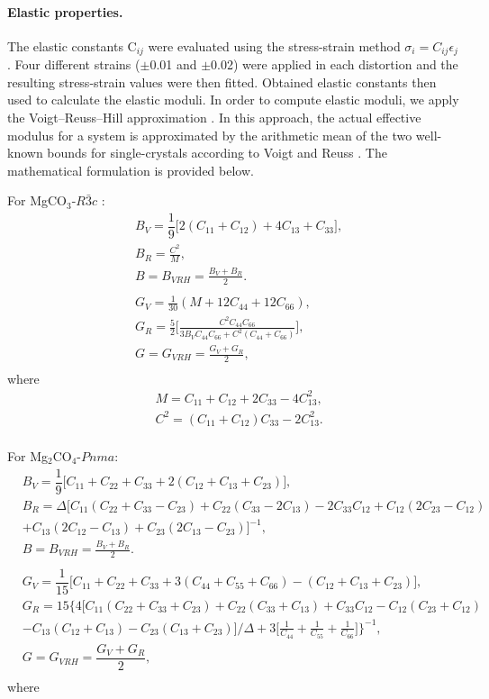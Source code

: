 \documentclass[a4paperm]{article}
\begin{document}
\paragraph{Elastic properties.}
The elastic constants C$_{ij}$ were evaluated using the stress-strain method $\sigma_i=C_{ij}\epsilon_j$.
Four different strains ($\pm$0.01 and $\pm$0.02) were applied in each distortion and the resulting stress-strain values were then fitted.
Obtained elastic constants then used to calculate the elastic moduli.
In order to compute elastic moduli, we apply the Voigt–Reuss–Hill approximation \cite{hill1952,hill1963}.
In this approach, the actual effective modulus for a system is approximated by the arithmetic mean of the two well-known bounds for single-crystals according to Voigt \cite{voigt1928} and Reuss \cite{reuss1929}.
The mathematical formulation is provided below.

For MgCO$_3$-$R\bar{3}c$ :
\begin{align*}
 &B_V = \dfrac{1}{9} \big[ 2 (C_{11}+C_{12})+4C_{13}+C_{33}\big], \\
 &B_R = \frac{C^2}{M}, \\
 &B =B_{VRH} = \frac{B_V+B_R}{2}. \\
 \\
 &G_V = \frac{1}{30} (M+12C_{44}+12C_{66}), \\
 &G_R = \frac{5}{2} \bigg[ \frac{C^2C_{44}C_{66}}{3B_VC_{44}C_{66}+C^2(C_{44}+C_{66})} \bigg], \\
 &G=G_{VRH}=\frac{G_V+G_R}{2}, \\
\end{align*}
where
\begin{align*}
	&M=C_{11}+C_{12}+2C_{33}-4C^2_{13}, \\
	&C^2=(C_{11}+C_{12})C_{33}-2C^2_{13}.\\
\end{align*}

For Mg$_2$CO$_4$-$Pnma$:
\begin{align*}
 &B_V = \dfrac{1}{9} \big[ C_{11}+C_{22}+C_{33}+2(C_{12}+C_{13}+C_{23}) \big], \\
 &B_R=\Delta\big[ C_{11}(C_{22}+C_{33}-C_{23})+C_{22}(C_{33}-2C_{13})-2C_{33}C_{12} + C_{12}(2C_{23}-C_{12})\\
 &	+C_{13}(2C_{12}-C_{13})+C_{23}(2C_{13}-C_{23}) \big]^{-1} , \\
 & B=B_{VRH}=\frac{B_V+B_R}{2}. \\
 \\
 &G_V=\dfrac{1}{15}\big[ C_{11}+C_{22}+C_{33}+3(C_{44}+C_{55}+C_{66})-(C_{12}+C_{13}+C_{23}) \big], \\
 &G_R=15 \big\lbrace 4 \big[ C_{11}(C_{22}+C_{33}+C_{23}) + C_{22}(C_{33}+C_{13})+ C_{33}C_{12}-C_{12}(C_{23}+C_{12})   \\
 &-C_{13}(C_{12}+C_{13})-C_{23}(C_{13}+C_{23}) \big] / \Delta + 3 \big[ \frac{1}{C_{44}}+\frac{1}{C_{55}} + \frac{1}{C_{66}} \big] \big\rbrace^{-1} , \\
 & G=G_{VRH}= \dfrac{G_V+G_R}{2}, \\
\end{align*}
 where
 
\end{document}

